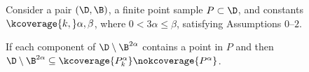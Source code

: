

\begin{theorem}\label{thm:algorithmic_tcc}
    Consider a pair $(\D,\B)$, a finite point sample $P\subset\D$, and constants $\kcoverage{k,}\alpha,\beta$, where $0 < 3\alpha\leq \beta$, satisfying Assumptions $0$--$2$.%

    If each component of $\D\setminus \B^{2\alpha}$ contains a point in $P$ and
    \kcoverage{\[\rank~\hom_d(\clique_k(G_1, G_1[Q])\hookrightarrow \clique_k(G_2, G_2[Q])) =|\textrm{Components}(G_1[P\setminus Q])|\]}
    \nokcoverage{\[\rank~\hom_d(\rips_\alpha(P, Q)\hookrightarrow \rips_\beta(P, Q)) = |\textrm{Components}(\rips_\alpha(P\setminus Q))|\]}
    then $\D\setminus\B^{2\alpha}\subseteq \kcoverage{P_k^\alpha}\nokcoverage{P^\alpha}$.
\end{theorem}

